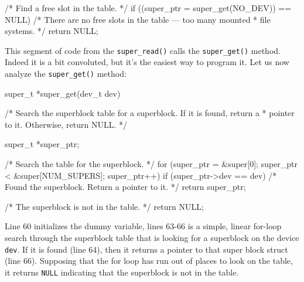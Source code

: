 \begin{code}[numbers=left,firstnumber=84,label={[Beginning of /brainix/src/fs/super.c]End of /brainix/src/fs/super.c}]
      /* Find a free slot in the table. */
      if ((super_ptr = super_get(NO_DEV)) == NULL)
           /* There are no free slots in the table --- too many mounted
            * file systems. */
           return NULL;
\end{code}
This segment of code from the \verb|super_read()| calls the \verb|super_get()| method. Indeed it is a bit convoluted, but it's the easiest way to program it. Let us now analyze the \verb|super_get()| method:
\begin{code}[numbers=left,firstnumber=54,label={[Beginning of /brainix/src/fs/super.c]End of /brainix/src/fs/super.c}]
 super_t *super_get(dev_t dev)
 {
 
 /* Search the superblock table for a superblock.  If it is found, return a
  * pointer to it.  Otherwise, return NULL. */
 
      super_t *super_ptr;
 
      /* Search the table for the superblock. */
      for (super_ptr = &super[0]; super_ptr < &super[NUM_SUPERS]; super_ptr++)
           if (super_ptr->dev == dev)
                /* Found the superblock.  Return a pointer to it. */
                return super_ptr;
 
      /* The superblock is not in the table. */
      return NULL;
 }
\end{code}
Line 60 initializes the dummy variable, lines 63-66 is a simple, linear for-loop search through the superblock table that is looking for a superblock on the device \verb|dev|. If it is found (line 64), then it returns a pointer to that super block struct (line 66). Supposing that the for loop has run out of places to look on the table, it returns \verb|NULL| indicating that the superblock is not in the table.

